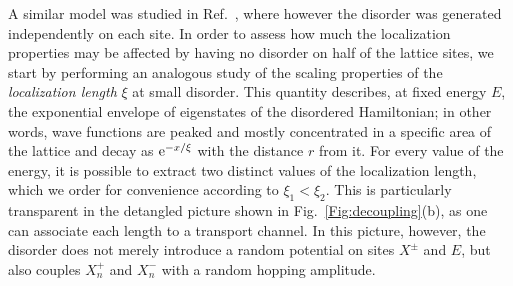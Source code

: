 \documentclass[prl,aps,twocolumn,showpacs,superscriptaddress,longbibliography]{revtex4-1}
\newcommand{\rme}[1]{{\rm{e}}^{#1}}
\begin{document}
A similar model was studied in Ref.~\cite{Leykam2017}, where however the disorder was generated independently on each site. In order to assess how much the localization properties may be affected by having no disorder on half of the lattice sites, we start by performing an analogous study of the scaling properties of the \emph{localization length} $\xi$ at small disorder. This quantity describes, at fixed energy $E$, the exponential envelope of eigenstates of the disordered Hamiltonian; in other words, wave functions are peaked and mostly concentrated in a specific area of the lattice and decay as $\rme{-x/\xi}$ with the distance $r$ from it. For every value of the energy, it is possible to extract two distinct values of the localization length, which we order for convenience according to $\xi_1 < \xi_2$. This is particularly transparent in the detangled picture shown in Fig.~\ref{Fig:decoupling}(b), as one can associate each length to a transport channel. In this picture, however, the disorder does not merely introduce a random potential on sites $X^{\pm}$ and $E$, but also couples $X^{+}_n$ and $X^{-}_n$ with a random hopping amplitude.
\end{document}
